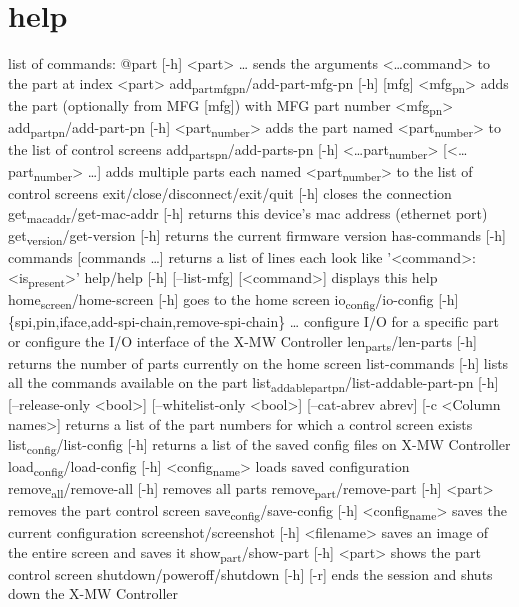 \documentclass[11pt]{article}
\author{Cole Turner}
\date{\today}
\title{}
\begin{document}
\tableofcontents

\section{help}
\label{sec:org52eea40}
list of commands:
  @part [-h] <part> \ldots{}
    sends the arguments <\ldots{}command> to the part at index <part>
  add\textsubscript{part}\textsubscript{mfg}\textsubscript{pn}/add-part-mfg-pn [-h] [mfg] <mfg\textsubscript{pn}>
    adds the part (optionally from MFG [mfg]) with MFG part number <mfg\textsubscript{pn}>
  add\textsubscript{part}\textsubscript{pn}/add-part-pn [-h] <part\textsubscript{number}>
    adds the part named <part\textsubscript{number}> to the list of control screens
  add\textsubscript{parts}\textsubscript{pn}/add-parts-pn [-h] <\ldots{}part\textsubscript{number}> [<\ldots{}part\textsubscript{number}> \ldots{}]
    adds multiple parts each named <part\textsubscript{number}> to the list of control screens
  exit/close/disconnect/exit/quit [-h]
    closes the connection
  get\textsubscript{mac}\textsubscript{addr}/get-mac-addr [-h]
    returns this device's mac address (ethernet port)
  get\textsubscript{version}/get-version [-h]
    returns the current firmware version
  has-commands [-h] commands [commands \ldots{}]
    returns a list of lines each look like '<command>: <is\textsubscript{present}>'
  help/help [-h] [--list-mfg] [<command>]
    displays this help
  home\textsubscript{screen}/home-screen [-h]
    goes to the home screen
  io\textsubscript{config}/io-config [-h] \{spi,pin,iface,add-spi-chain,remove-spi-chain\} \ldots{}
    configure I/O for a specific part or configure the I/O interface of the
    X-MW Controller
  len\textsubscript{parts}/len-parts [-h]
    returns the number of parts currently on the home screen
  list-commands [-h]
    lists all the commands available on the part
  list\textsubscript{addable}\textsubscript{part}\textsubscript{pn}/list-addable-part-pn  [-h] [--release-only <bool>] [--whitelist-only <bool>]
          [--cat-abrev abrev] [-c <Column names>]
    returns a list of the part numbers for which a control screen exists
  list\textsubscript{config}/list-config [-h]
    returns a list of the saved config files on X-MW Controller
  load\textsubscript{config}/load-config [-h] <config\textsubscript{name}>
    loads saved configuration
  remove\textsubscript{all}/remove-all [-h]
    removes all parts
  remove\textsubscript{part}/remove-part [-h] <part>
    removes the part control screen
  save\textsubscript{config}/save-config [-h] <config\textsubscript{name}>
    saves the current configuration
  screenshot/screenshot [-h] <filename>
    saves an image of the entire screen and saves it
  show\textsubscript{part}/show-part [-h] <part>
    shows the part control screen
  shutdown/poweroff/shutdown [-h] [-r]
    ends the session and shuts down the X-MW Controller
\end{document}
